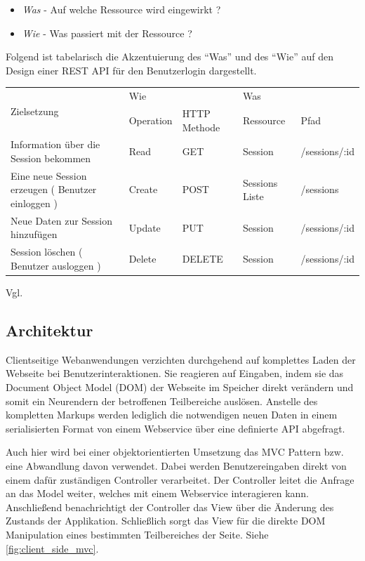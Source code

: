 \begin{itemize}
 \item \emph{Was} - Auf welche Ressource wird eingewirkt ?
 \item \emph{Wie} - Was passiert mit der Ressource ?
\end{itemize}

Folgend ist tabelarisch die Akzentuierung des "`Was"' und des "`Wie"' auf den Design einer REST API für den Benutzerlogin dargestellt.

\begin{center}
    \begin{tabular}{ | p{5cm} | l | l | l | l |}
    \hline
    \multirow{2}{*}{Zielsetzung} & \multicolumn{2}{l|}{ Wie } & \multicolumn{2}{l|}{ Was } \\ \cline{2-5}
    & Operation & HTTP Methode & Ressource & Pfad \\ \hline
    Information über die Session  bekommen & Read & GET & Session & /sessions/:id \\ \hline
    Eine neue Session erzeugen ( Benutzer einloggen ) & Create & POST & Sessions Liste & /sessions \\ \hline
    Neue Daten zur Session hinzufügen & Update & PUT & Session & /sessions/:id \\ \hline
    Session löschen ( Benutzer ausloggen ) & Delete & DELETE & Session & /sessions/:id \\ \hline
    \end{tabular}
\end{center}

Vgl. \cite[Kap. REST and CRUD]{LaunchSchool:2016}

\subsection{Architektur}
\label{sec:architecture}

Clientseitige Webanwendungen verzichten durchgehend auf komplettes Laden der Webseite bei Benutzerinteraktionen. Sie reagieren auf Eingaben, indem sie das Document Object Model (DOM) der Webseite im Speicher direkt verändern und somit ein Neurendern der betroffenen Teilbereiche auslösen. Anstelle des kompletten Markups werden lediglich die notwendigen neuen Daten in einem serialisierten Format von einem Webservice über eine definierte API abgefragt.

Auch hier wird bei einer objektorientierten Umsetzung das MVC Pattern bzw. eine Abwandlung davon verwendet. Dabei werden Benutzereingaben direkt von einem dafür zuständigen Controller verarbeitet. Der Controller leitet die Anfrage an das Model weiter, welches mit einem Webservice interagieren kann. Anschließend benachrichtigt der Controller das View über die Änderung des Zustands der Applikation. Schließlich sorgt das View für die direkte DOM Manipulation eines bestimmten Teilbereiches der Seite.
Siehe \ref{fig:client_side_mvc}.

